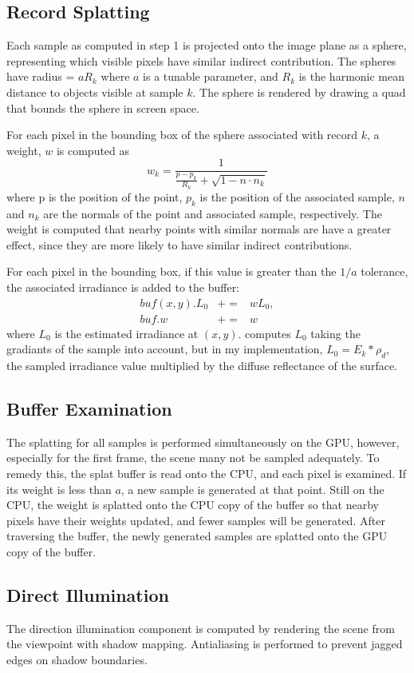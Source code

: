 \documentclass[10pt,twopage]{acmsiggraph}
\begin{document}
\subsection{Record Splatting}
Each sample as computed in step 1 is projected onto the image plane as a sphere, representing which visible pixels have similar indirect contribution.  The spheres have radius = $aR_k$ where $a$ is a tunable parameter, and $R_k$ is the harmonic mean distance to objects visible at sample $k$.  The sphere is rendered by drawing a quad that bounds the sphere in screen space.

For each pixel in the bounding box of the sphere associated with record $k$, a weight, $w$ is computed as
$$
w_k = \frac{1}{\frac{p - p_k}{R_k} + \sqrt{1 - n \cdot n_k}}
$$
where p is the position of the point, $p_k$ is the position of the associated sample, $n$ and $n_k$ are the normals of the point and associated sample, respectively.  The weight is computed that nearby points with similar normals are have a greater effect, since they are more likely to have similar indirect contributions.

For each pixel in the bounding box, if this value is greater than the $1/a$ tolerance, the associated irradiance is added to the buffer: 
\begin{eqnarray*}
buf(x,y).L_0 &+=& wL_0,  \\
buf.w &+=& w
\end{eqnarray*}
where $L_0$ is the estimated irradiance at $(x,y)$.  \cite{mainpaper} computes $L_0$ taking the gradiants of the sample into account, but in my implementation, $L_0 = E_k*\rho_d$, the sampled irradiance value multiplied by the diffuse reflectance of the surface.  

\subsection{Buffer Examination}
The splatting for all samples is performed simultaneously on the GPU, however, especially for the first frame, the scene many not be sampled adequately.  To remedy this, the splat buffer is read onto the CPU, and each pixel is examined.  If its weight is less than $a$, a new sample is generated at that point.  Still on the CPU, the weight is splatted onto the CPU copy of the buffer so that nearby pixels have their weights updated, and fewer samples will be generated.  After traversing the buffer, the newly generated samples are splatted onto the GPU copy of the buffer.

\subsection{Direct Illumination}
The direction illumination component is computed by rendering the scene from the viewpoint with shadow mapping.  Antialiasing is performed to prevent jagged edges on shadow boundaries.
\end{document}
